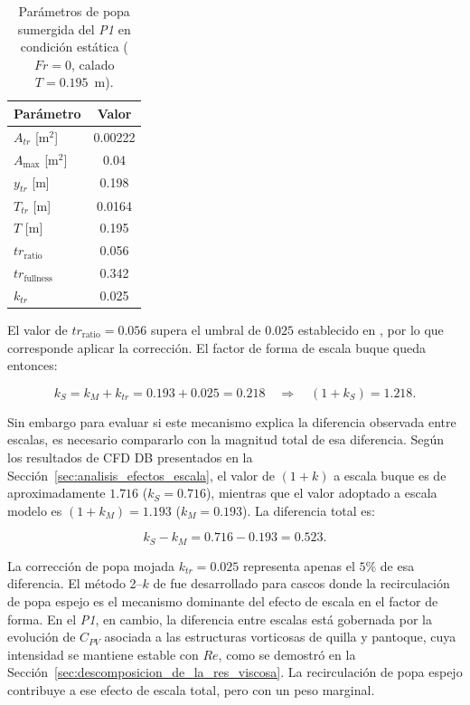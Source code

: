 \begin{table}[h]
\centering
\caption{Parámetros de popa sumergida del \textit{P1} en condición estática 
($Fr = 0$, calado $T = 0{.}195$~m).}
\label{tab:tpa_transom_params}
\small
\begin{tabular}{lc}
\toprule
\textbf{Parámetro} & \textbf{Valor} \\
\midrule
$A_{tr}$ [m$^2$]            & 0{.}00222 \\
$A_{\max}$ [m$^2$]          & 0{.}04 \\
$y_{tr}$ [m]                & 0{.}198 \\
$T_{tr}$ [m]                & 0{.}0164 \\
$T$ [m]                     & 0{.}195 \\
\addlinespace[3pt]
$tr_{\text{ratio}}$         & 0{.}056 \\
$tr_{\text{fullness}}$      & 0{.}342 \\
\addlinespace[3pt]
$k_{tr}$                    & 0{.}025 \\
\bottomrule
\end{tabular}
\end{table}

El valor de $tr_{\text{ratio}} = 0{.}056$ supera el umbral de $0{.}025$ 
establecido en \citet{korkmaz_wetted_transom}, por lo que corresponde aplicar 
la corrección. El factor de forma de escala buque queda entonces:

\begin{equation}
    k_S = k_M + k_{tr} = 0{.}193 + 0{.}025 = 0{.}218
    \quad \Rightarrow \quad
    (1+k_S) = 1{.}218.
\end{equation}

Sin embargo para evaluar si este mecanismo explica la diferencia observada 
entre escalas, es necesario compararlo con la magnitud total de esa diferencia. 
Según los resultados de CFD DB presentados en la 
Sección~\ref{sec:analisis_efectos_escala}, el valor de $(1+k)$ a escala buque 
es de aproximadamente $1{.}716$ ($k_S = 0{.}716$), mientras que el valor adoptado 
a escala modelo es $(1+k_M) = 1{.}193$ ($k_M = 0{.}193$). La diferencia total es:

\begin{equation}
    k_S - k_M = 0{.}716 - 0{.}193 = 0{.}523.
\end{equation}

La corrección de popa mojada $k_{tr} = 0{.}025$ representa apenas el $5\%$ de 
esa diferencia. El método 2--$k$ de \citet{korkmaz_wetted_transom} fue 
desarrollado para cascos donde la recirculación de popa espejo es el 
mecanismo dominante del efecto de escala en el factor de forma. En el 
\textit{P1}, en cambio, la diferencia entre escalas está gobernada por la 
evolución de $C_{PV}$ asociada a las estructuras vorticosas de quilla y 
pantoque, cuya intensidad se mantiene estable con $Re$, como se demostró en 
la Sección~\ref{sec:descomposicion_de_la_res_viscosa}. La recirculación de 
popa espejo contribuye a ese efecto de escala total, pero con un peso 
marginal.


